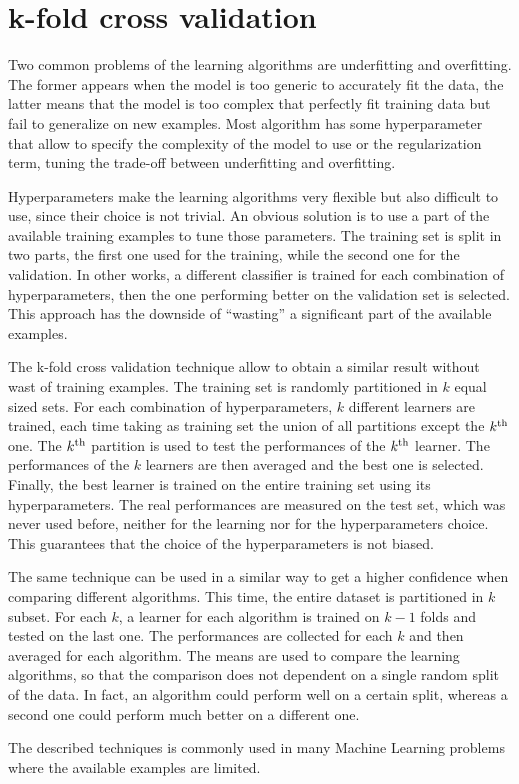 \section{k-fold cross validation}
\label{sec:k_fold_cross_validation}

Two common problems of the learning algorithms are underfitting and overfitting.
The former appears when the model is too generic to accurately fit the data, the latter means that the model is too complex that perfectly fit training data but fail to generalize on new examples.
Most algorithm has some hyperparameter that allow to specify the complexity of the model to use or the regularization term, tuning the trade-off between underfitting and overfitting.

Hyperparameters make the learning algorithms very flexible but also difficult to use, since their choice is not trivial.
An obvious solution is to use a part of the available training examples to tune those parameters.
The training set is split in two parts, the first one used for the training, while the second one for the validation.
In other works, a different classifier is trained for each combination of hyperparameters, then the one performing better on the validation set is selected. 
This approach has the downside of ``wasting'' a significant part of the available examples.

The k-fold cross validation technique allow to obtain a similar result without wast of training examples.
The training set is randomly partitioned in $k$ equal sized sets.
For each combination of hyperparameters, $k$ different learners are trained, each time taking as training set the union of all partitions except the $k\textsuperscript{th}$ one.
The $k\textsuperscript{th}$ partition is used to test the performances of the $k\textsuperscript{th}$ learner.
The performances of the $k$ learners are then averaged and the best one is selected.
Finally, the best learner is trained on the entire training set using its hyperparameters.
The real performances are measured on the test set, which was never used before, neither for the learning nor for the hyperparameters choice.
This guarantees that the choice of the hyperparameters is not biased.

The same technique can be used in a similar way to get a higher confidence when comparing different algorithms.
This time, the entire dataset is partitioned in $k$ subset.
For each $k$, a learner for each algorithm is trained on $k-1$ folds and tested on the last one.
The performances are collected for each $k$ and then averaged for each algorithm.
The means are used to compare the learning algorithms, so that the comparison does not dependent on a single random split of the data.
In fact, an algorithm could perform well on a certain split, whereas a second one could perform much better on a different one.

The described techniques is commonly used in many Machine Learning problems where the available examples are limited.
